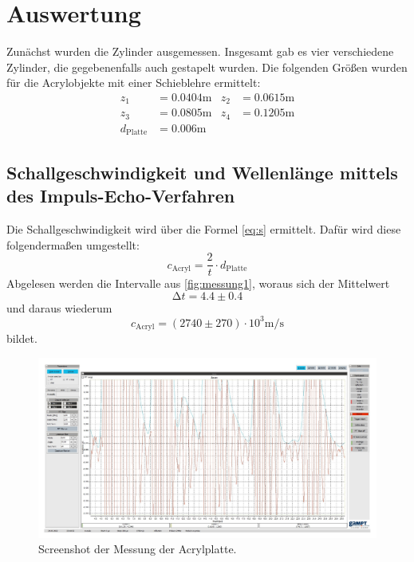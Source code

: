 \section{Auswertung}
\label{sec:Auswertung}

Zunächst wurden die Zylinder ausgemessen. Insgesamt gab es vier verschiedene Zylinder, die gegebenenfalls auch gestapelt wurden.
Die folgenden Größen wurden für die Acrylobjekte mit einer Schieblehre ermittelt:
\begin{align*}
  z_1 &= 0.0404 \unit\meter & z_2 &= 0.0615 \unit\meter \\
  z_3 &= 0.0805 \unit\meter & z_4 &= 0.1205 \unit\meter \\
  d_\text{Platte} &= 0.006 \unit\meter
\end{align*}

\subsection{Schallgeschwindigkeit und Wellenlänge mittels des Impuls-Echo-Verfahren}

Die Schallgeschwindigkeit wird über die Formel \autoref{eq:s} ermittelt.
Dafür wird diese folgendermaßen umgestellt:
\begin{equation}\label{eq:c_schall}
  c_\text{Acryl} = \frac{2}{t} \cdot d_\text{Platte}
\end{equation}
Abgelesen werden die Intervalle aus \autoref{fig:messung1}, woraus sich der Mittelwert
\begin{equation}
  \increment t = 4.4 \pm 0.4
\end{equation}
und daraus wiederum
\begin{equation}
  c_\text{Acryl} = (2740 \pm 270) \cdot 10^3 \unit{\meter / \second}
\end{equation}
bildet. 

\begin{figure} [H]
  \centering
  \includegraphics[width =\linewidth]{pictures/Schallgeschwindigkeit/Messung1.pdf}
  \caption{Screenshot der Messung der Acrylplatte.}
  \label{fig:messung1}
\end{figure}

